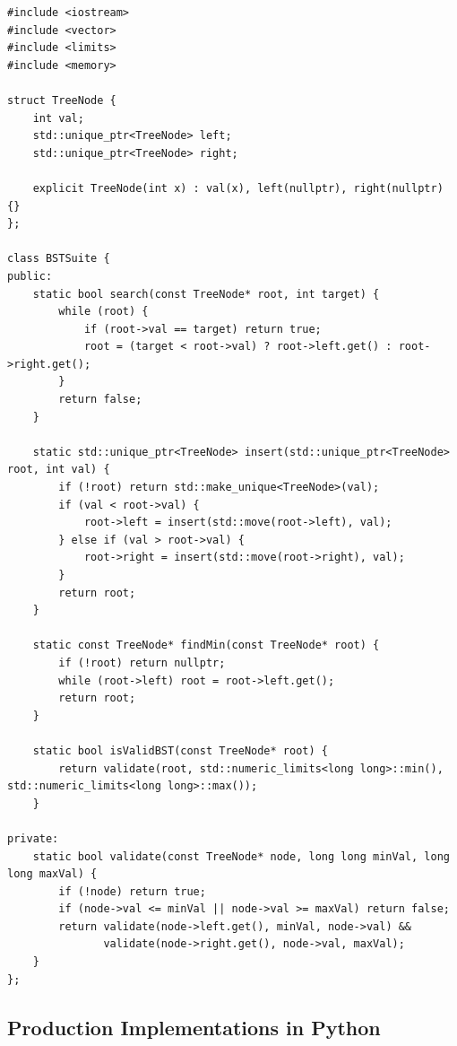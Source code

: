 \documentclass[10pt,journal,compsoc,onecolumn]{IEEEtran}
\begin{document}
\begin{verbatim}
#include <iostream>
#include <vector>
#include <limits>
#include <memory>

struct TreeNode {
    int val;
    std::unique_ptr<TreeNode> left;
    std::unique_ptr<TreeNode> right;

    explicit TreeNode(int x) : val(x), left(nullptr), right(nullptr) {}
};

class BSTSuite {
public:
    static bool search(const TreeNode* root, int target) {
        while (root) {
            if (root->val == target) return true;
            root = (target < root->val) ? root->left.get() : root->right.get();
        }
        return false;
    }

    static std::unique_ptr<TreeNode> insert(std::unique_ptr<TreeNode> root, int val) {
        if (!root) return std::make_unique<TreeNode>(val);
        if (val < root->val) {
            root->left = insert(std::move(root->left), val);
        } else if (val > root->val) {
            root->right = insert(std::move(root->right), val);
        }
        return root;
    }

    static const TreeNode* findMin(const TreeNode* root) {
        if (!root) return nullptr;
        while (root->left) root = root->left.get();
        return root;
    }

    static bool isValidBST(const TreeNode* root) {
        return validate(root, std::numeric_limits<long long>::min(), std::numeric_limits<long long>::max());
    }

private:
    static bool validate(const TreeNode* node, long long minVal, long long maxVal) {
        if (!node) return true;
        if (node->val <= minVal || node->val >= maxVal) return false;
        return validate(node->left.get(), minVal, node->val) &&
               validate(node->right.get(), node->val, maxVal);
    }
};
\end{verbatim}

\subsection{Production Implementations in Python}
\end{document}

